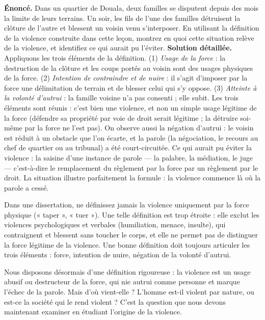 \documentclass[11pt]{article}
\begin{document}
\begin{exoresolu}
\textbf{Énoncé.} Dans un quartier de Douala, deux familles se disputent depuis des mois la limite de leurs terrains. Un soir, les fils de l'une des familles détruisent la clôture de l'autre et blessent un voisin venu s'interposer. En utilisant la définition de la violence construite dans cette leçon, montrez en quoi cette situation relève de la violence, et identifiez ce qui aurait pu l'éviter.
\tcblower
\textbf{Solution détaillée.} Appliquons les trois éléments de la définition. (1) \emph{Usage de la force} : la destruction de la clôture et les coups portés au voisin sont des usages physiques de la force. (2) \emph{Intention de contraindre et de nuire} : il s'agit d'imposer par la force une délimitation de terrain et de blesser celui qui s'y oppose. (3) \emph{Atteinte à la volonté d'autrui} : la famille voisine n'a pas consenti ; elle subit. Les trois éléments sont réunis : c'est bien une violence, et non un simple usage légitime de la force (défendre sa propriété par voie de droit serait légitime ; la détruire soi-même par la force ne l'est pas). On observe aussi la négation d'autrui : le voisin est réduit à un obstacle que l'on écarte, et la parole (la négociation, le recours au chef de quartier ou au tribunal) a été court-circuitée. Ce qui aurait pu éviter la violence : la saisine d'une instance de parole — la palabre, la médiation, le juge — c'est-à-dire le remplacement du règlement par la force par un règlement par le droit. La situation illustre parfaitement la formule : la violence commence là où la parole a cessé.
\end{exoresolu}

\begin{attention}
Dans une dissertation, ne définissez jamais la violence uniquement par la force physique (« taper », « tuer »). Une telle définition est trop étroite : elle exclut les violences psychologiques et verbales (humiliation, menace, insulte), qui contraignent et blessent sans toucher le corps, et elle ne permet pas de distinguer la force légitime de la violence. Une bonne définition doit toujours articuler les trois éléments : force, intention de nuire, négation de la volonté d'autrui.
\end{attention}

Nous disposons désormais d'une définition rigoureuse : la violence est un usage abusif ou destructeur de la force, qui nie autrui comme personne et marque l'échec de la parole. Mais d'où vient-elle ? L'homme est-il violent par nature, ou est-ce la société qui le rend violent ? C'est la question que nous devons maintenant examiner en étudiant l'origine de la violence.
\end{document}
